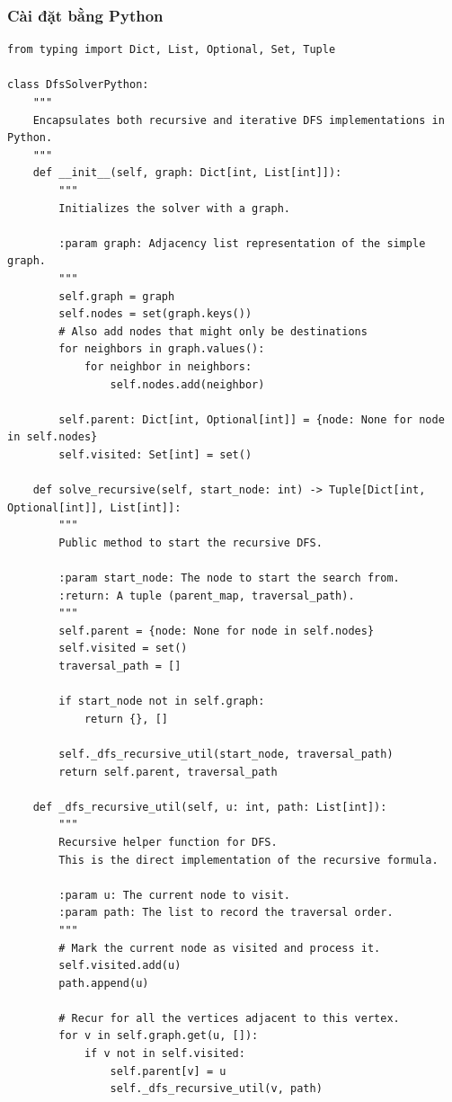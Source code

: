 \documentclass[a4paper,12pt]{article}
\begin{document}
\subsubsection{Cài đặt bằng Python }
\begin{lstlisting}[style=pythonstyle, caption={Cài đặt DFS cho đơn đồ thị trong Python (cả đệ quy và lặp).}, label={lst:python_dfs_11}]
from typing import Dict, List, Optional, Set, Tuple

class DfsSolverPython:
    """
    Encapsulates both recursive and iterative DFS implementations in Python.
    """
    def __init__(self, graph: Dict[int, List[int]]):
        """
        Initializes the solver with a graph.

        :param graph: Adjacency list representation of the simple graph.
        """
        self.graph = graph
        self.nodes = set(graph.keys())
        # Also add nodes that might only be destinations
        for neighbors in graph.values():
            for neighbor in neighbors:
                self.nodes.add(neighbor)
        
        self.parent: Dict[int, Optional[int]] = {node: None for node in self.nodes}
        self.visited: Set[int] = set()

    def solve_recursive(self, start_node: int) -> Tuple[Dict[int, Optional[int]], List[int]]:
        """
        Public method to start the recursive DFS.

        :param start_node: The node to start the search from.
        :return: A tuple (parent_map, traversal_path).
        """
        self.parent = {node: None for node in self.nodes}
        self.visited = set()
        traversal_path = []

        if start_node not in self.graph:
            return {}, []
            
        self._dfs_recursive_util(start_node, traversal_path)
        return self.parent, traversal_path

    def _dfs_recursive_util(self, u: int, path: List[int]):
        """
        Recursive helper function for DFS.
        This is the direct implementation of the recursive formula.

        :param u: The current node to visit.
        :param path: The list to record the traversal order.
        """
        # Mark the current node as visited and process it.
        self.visited.add(u)
        path.append(u)

        # Recur for all the vertices adjacent to this vertex.
        for v in self.graph.get(u, []):
            if v not in self.visited:
                self.parent[v] = u
                self._dfs_recursive_util(v, path)


\end{lstlisting}
\end{document}
